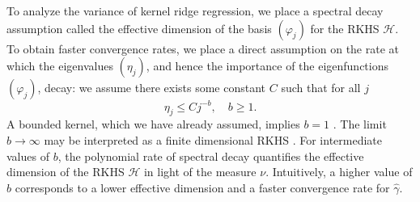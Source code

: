 

To analyze the variance of kernel ridge regression, we place a spectral decay assumption called the effective dimension of the basis $(\varphi_j)$ for the RKHS $\mathcal{H}$. 
To obtain faster convergence rates, we place a direct assumption on the rate at which the eigenvalues $(\eta_j)$, and hence the importance of the eigenfunctions $(\varphi_j)$, decay: we assume there exists some constant $C$ such that for all $j$
\begin{equation}\label{eq:b}
  \eta_j\leq C j^{-b},\quad b\geq 1.
\end{equation} 
A bounded kernel, which we have already assumed, implies $b=1$ \cite[Lemma 10]{fischer2017sobolev}. The limit $b\rightarrow \infty$ may be interpreted as a finite dimensional RKHS \cite{caponnetto2007optimal}. For intermediate values of $b$, the polynomial rate of spectral decay quantifies the effective dimension of the RKHS $\mathcal{H}$ in light of the measure $\nu$. Intuitively, a higher value of $b$ corresponds to a lower effective dimension and a faster convergence rate for $\hat{\gamma}$.

